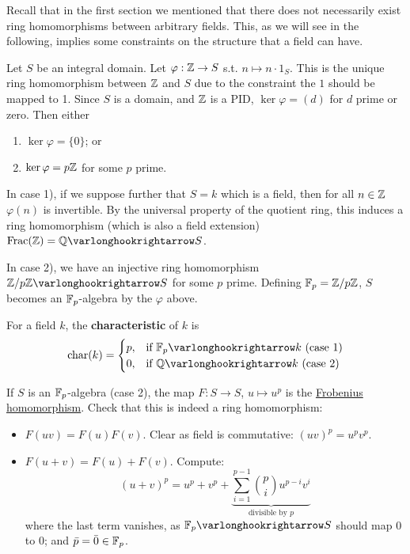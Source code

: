 \textstart
Recall that in the first section we mentioned that there does not necessarily exist ring homomorphisms between arbitrary fields. This, as we will see in the following, implies some constraints on the structure that a field can have.

Let $S$ be an integral domain. Let $\varphi: \mathbb{Z} \to S$ s.t. $n \mapsto n \cdot 1_S$. This is the unique ring homomorphism between $\mathbb{Z}$ and $S$ due to the constraint the $1$ should be mapped to 1. Since $S$ is a domain, and $\mathbb{Z}$ is a PID, $\ker \varphi = (d)$ for $d$ prime or zero. Then either 
\begin{enumerate}[label=\arabic*)]
    \item $\ker \varphi = \{0\}$; or
    \item $\ker \varphi = p\mathbb{Z}$ for some $p$ prime.
\end{enumerate}

In case 1), if we suppose further that $S = k$ which is a field, then for all $n \in \mathbb{Z}$ $\varphi(n)$ is invertible. By the universal property of the quotient ring, this induces a ring homomorphism (which is also a field extension) $\Frac(\Z) = \Q \ext S$. 

In case 2), we have an injective ring homomorphism $\Z/p\Z \ext S$ for some $p$ prime. Defining $\mathbb{F}_p = \mathbb{Z}/p\mathbb{Z}$, $S$ becomes an $\mathbb{F}_p$-algebra by the $\varphi$ above. 

\begin{definition}[Characteristic]
    For a field $k$, the \textbf{characteristic} of $k$ is
    \[
        \fchar(k) = 
        \begin{cases}
            p, & \text{if $\F_p \ext k$ (case 1)} \\
            0, & \text{if $\Q \ext k$ (case 2)}
        \end{cases}
    \]
\end{definition}

\begin{remark}
    If $S$ is an $\mathbb{F}_p$-algebra (case 2), the map $F: S \to S$, $u \mapsto u^p$ is the \underline{Frobenius homomorphism}. Check that this is indeed a ring homomorphism:
    \begin{itemize}
        \item $F(uv) = F(u) F(v)$. Clear as field is commutative: $(uv)^p = u^p v^p$.
        \item $F(u + v) = F(u) + F(v)$. Compute: 
        \[
            (u + v)^p = u^p + v^p + \underbrace{\sum_{i = 1}^{p - 1} \binom{p}{i} u^{p-i} v^i}_{\text{divisible by $p$}}
        \]
        where the last term vanishes, as $\F_p \ext S$ should map $0$ to $0$; and $\bar{p} = \bar{0} \in \mathbb{F}_p$.
    \end{itemize}
\end{remark}


